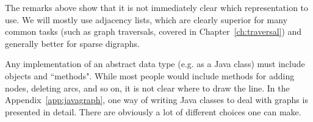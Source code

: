 The remarks above show that it is not immediately clear which
representation to use. We will mostly use adjacency lists, which are
clearly superior for many common tasks (such as graph traversals, covered
in Chapter~\ref{ch:traversal}) and generally better for sparse digraphs.


Any implementation of an abstract data type (e.g. as a Java class) must
include objects and ``methods".  While most people would include methods
for adding nodes, deleting arcs, and so on, it is not clear where to
draw the line. In the Appendix~\ref{app:javagraph}, one way of writing
Java classes to deal with graphs is presented in detail. There are
obviously a lot of different choices one can make.
